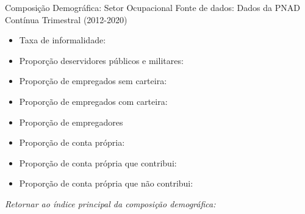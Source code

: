 \begin{frame}[label=_composicao_demografica_setor]{Composição Demográfica: Setor Ocupacional}
{\footnotesize Fonte de dados: Dados da PNAD Contínua Trimestral (2012-2020)}
\begin{itemize}
\item{Taxa de informalidade: \hyperlink{_composicao_demografica_setor_taxa_de_informalidade}{}}
\item{Proporção deservidores públicos e militares: \hyperlink{_composicao_demografica_setor_prop_militar}{}}
\item{Proporção de empregados sem carteira: \hyperlink{_composicao_demografica_setor_prop_empregadoSC}{}}
\item{Proporção de empregados com carteira: \hyperlink{_composicao_demografica_setor_prop_empregadoCC}{}}
\item{Proporção de empregadores \hyperlink{_composicao_demografica_setor_prop_empregador}{}}
\item{Proporção de conta própria: \hyperlink{_composicao_demografica_setor_prop_cpropria}{}}
\item{Proporção de conta própria que contribui: \hyperlink{_composicao_demografica_setor_prop_cpropriaC}{}}
\item{Proporção de conta própria que não contribui: \hyperlink{_composicao_demografica_setor_prop_cpropriaNc}{}}
\end{itemize}

\begin{small}
\textit{Retornar ao índice principal da composição demográfica: \hyperlink{_composicao_demografica}{} }
\end{small}

\end{frame}


